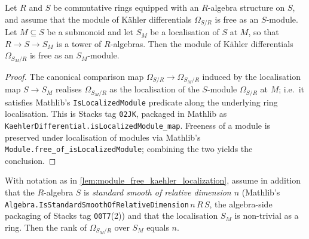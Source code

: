 \begin{lemma}


  \label{lem:module_free_kaehler_localization}
  Let \(R\) and \(S\) be commutative rings equipped with an \(R\)-algebra
  structure on \(S\), and assume that the module of K\"ahler differentials
  \(\Omega_{S/R}\) is free as an \(S\)-module. Let \(M \subseteq S\) be a
  submonoid and let \(S_M\) be a localisation of \(S\) at \(M\), so that
  \(R \to S \to S_M\) is a tower of \(R\)-algebras. Then the module of
  K\"ahler differentials \(\Omega_{S_M / R}\) is free as an
  \(S_M\)-module.
\end{lemma}

\begin{proof}
  The canonical comparison map
  \(\Omega_{S/R} \to \Omega_{S_M/R}\) induced by the localisation map
  \(S \to S_M\) realises \(\Omega_{S_M/R}\) as the localisation of the
  \(S\)-module \(\Omega_{S/R}\) at \(M\); i.e.\ it satisfies Mathlib's
  \texttt{IsLocalizedModule} predicate along the underlying ring
  localisation. This is Stacks tag \texttt{02JK}, packaged in Mathlib as
  \texttt{KaehlerDifferential.isLocalizedModule\_map}. Freeness of a
  module is preserved under localisation of modules via Mathlib's
  \texttt{Module.free\_of\_isLocalizedModule}; combining the two yields
  the conclusion.
\end{proof}

\begin{lemma}


  \label{lem:rank_kaehler_localization_eq_relative_dim}
  With notation as in \cref{lem:module_free_kaehler_localization},
  assume in addition that the \(R\)-algebra \(S\) is \emph{standard
  smooth of relative dimension \(n\)} (Mathlib's
  \texttt{Algebra.IsStandardSmoothOfRelativeDimension}\,\(n\)\,\(R\)\,\(S\),
  the algebra-side packaging of Stacks tag \texttt{00T7}(2)) and that
  the localisation \(S_M\) is non-trivial as a ring. Then the rank of
  \(\Omega_{S_M / R}\) over \(S_M\) equals \(n\).
\end{lemma}

